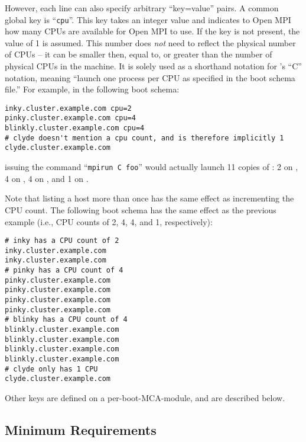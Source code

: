 However, each line can also specify arbitrary ``key=value'' pairs.  A
common global key is ``{\tt cpu}''.  This key takes an integer value
and indicates to Open MPI how many CPUs are available for Open MPI to use.  If
the key is not present, the value of 1 is assumed.  This number does
{\em not} need to reflect the physical number of CPUs -- it can be
smaller then, equal to, or greater than the number of physical CPUs in
the machine.  It is solely used as a shorthand notation for
's ``C'' notation, meaning ``launch one process per CPU
as specified in the boot schema file.''  For example, in the following
boot schema:

\lstset{style=lam-shell}
\begin{lstlisting}
inky.cluster.example.com cpu=2
pinky.cluster.example.com cpu=4
blinkly.cluster.example.com cpu=4
# clyde doesn't mention a cpu count, and is therefore implicitly 1
clyde.cluster.example.com
\end{lstlisting}

\noindent issuing the command ``{\tt mpirun C foo}'' would actually
launch 11 copies of : 2 on , 4 on , 4
on , and 1 on .

Note that listing a host more than once has the same effect as
incrementing the CPU count.  The following boot schema has the same
effect as the previous example (i.e., CPU counts of 2, 4, 4, and 1,
respectively):

\lstset{style=lam-shell}
\begin{lstlisting}
# inky has a CPU count of 2
inky.cluster.example.com
inky.cluster.example.com
# pinky has a CPU count of 4
pinky.cluster.example.com
pinky.cluster.example.com
pinky.cluster.example.com
pinky.cluster.example.com
# blinky has a CPU count of 4
blinkly.cluster.example.com 
blinkly.cluster.example.com 
blinkly.cluster.example.com 
blinkly.cluster.example.com 
# clyde only has 1 CPU
clyde.cluster.example.com
\end{lstlisting}

Other keys are defined on a per-boot-MCA-module, and are described
below.


\subsection{Minimum Requirements}
\label{sec:mca-orte-pls-min-reqs}

